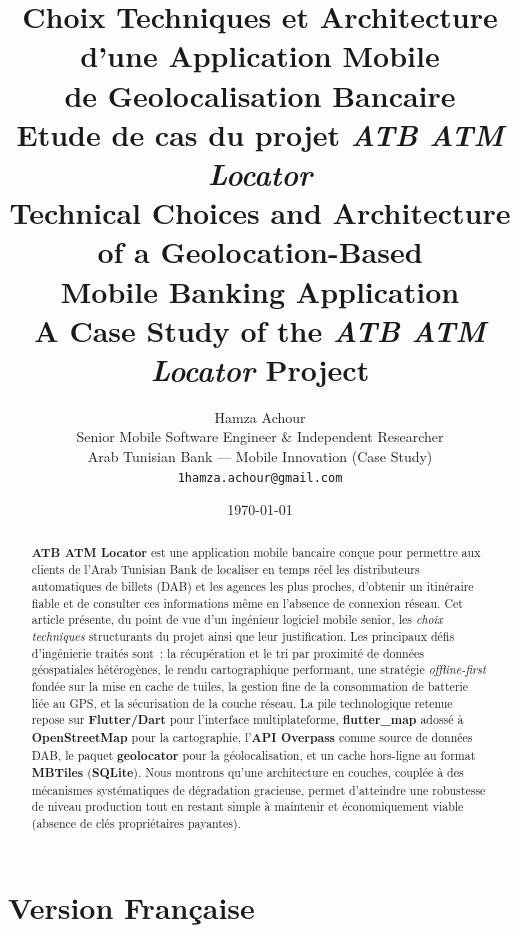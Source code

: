 \documentclass[11pt,a4paper]{article}
\title{\textbf{Choix Techniques et Architecture d'une Application Mobile\\
de Geolocalisation Bancaire}\\[4pt]
\large Etude de cas du projet \textit{ATB ATM Locator}\\[10pt]
\textbf{Technical Choices and Architecture of a Geolocation-Based\\
Mobile Banking Application}\\[4pt]
\large A Case Study of the \textit{ATB ATM Locator} Project}
\author{
  Hamza Achour\\
  \small Senior Mobile Software Engineer \& Independent Researcher\\
  \small Arab Tunisian Bank --- Mobile Innovation (Case Study)\\
  \small \texttt{1hamza.achour@gmail.com}
}
\date{\today}
\begin{document}
\maketitle
\thispagestyle{empty}

\begin{center}
\end{center}

\vspace{6pt}
\tableofcontents
\newpage

\part{Version Fran\c{c}aise}

\begin{abstract}
\noindent
\textbf{ATB ATM Locator} est une application mobile bancaire con\c{c}ue pour
permettre aux clients de l'Arab Tunisian Bank de localiser en temps r\'eel les
distributeurs automatiques de billets (DAB) et les agences les plus proches,
d'obtenir un itin\'eraire fiable et de consulter ces informations m\^eme en
l'absence de connexion r\'eseau. Cet article pr\'esente, du point de vue d'un
ing\'enieur logiciel mobile senior, les \emph{choix techniques} structurants du
projet ainsi que leur justification. Les principaux d\'efis d'ing\'enierie
trait\'es sont~: la r\'ecup\'eration et le tri par proximit\'e de donn\'ees
g\'eospatiales h\'et\'erog\`enes, le rendu cartographique performant, une
strat\'egie \emph{offline-first} fond\'ee sur la mise en cache de tuiles, la
gestion fine de la consommation de batterie li\'ee au GPS, et la s\'ecurisation
de la couche r\'eseau. La pile technologique retenue repose sur
\textbf{Flutter/Dart} pour l'interface multiplateforme, \textbf{flutter\_map}
adoss\'e \`a \textbf{OpenStreetMap} pour la cartographie, l'\textbf{API Overpass}
comme source de donn\'ees DAB, le paquet \textbf{geolocator} pour la
g\'eolocalisation, et un cache hors-ligne au format \textbf{MBTiles}
(\textbf{SQLite}). Nous montrons qu'une architecture en couches, coupl\'ee \`a
des m\'ecanismes syst\'ematiques de d\'egradation gracieuse, permet d'atteindre
une robustesse de niveau production tout en restant simple \`a maintenir et
\'economiquement viable (absence de cl\'es propri\'etaires payantes).
\end{abstract}
\end{document}
